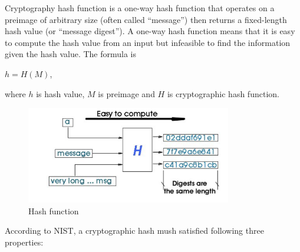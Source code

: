Cryptography hash function is a one-way hash function that operates on a preimage of arbitrary size (often called ``message”) then returns a fixed-length hash value (or ``message digest”). A one-way hash function means that it is easy to compute the hash value from an input but infeasible to find the information given the hash value. The formula is\\

\begin{center}
  $h = H(M)$,\\
\end{center}

where $h$ is hash value, $M$ is preimage and $H$ is cryptographic hash function.\\

\begin{figure}[ht!]
  \centering
  \includegraphics[width=0.8\textwidth]{images/hash_function.png}
  \caption[Hash function]{Hash function}
  \label{fig:hash_function}
\end{figure}

According to NIST, a cryptographic hash mush satisfied following three properties:

